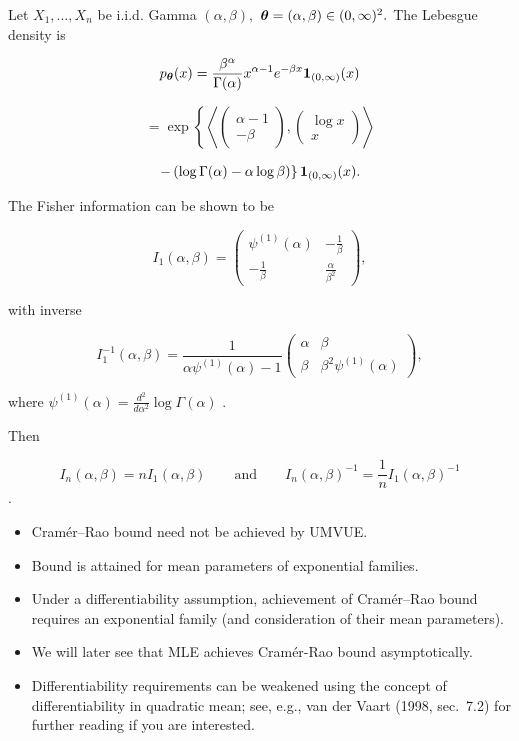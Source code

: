 \begin{ex}
    
Let \(X_1,\ldots,X_n\) be i.i.d. Gamma \((\alpha,\beta),\)
\(\boldsymbol{\theta}=(\alpha,\beta)\in(0,\infty)^2.\) The Lebesgue density is

\[p_{\boldsymbol{\theta}}(x) = \frac{\beta^{\alpha}}{\Gamma(\alpha)} x^{\alpha - 1} e^{-\beta x} \boldsymbol{1}_{(0,\infty)}(x)\]

\[= \exp\left\{ \left\langle \begin{pmatrix} \alpha - 1 \\ -\beta \end{pmatrix}, \begin{pmatrix} \log x \\ x \end{pmatrix} \right\rangle \right.\]

\[\left.- \left( \log \Gamma(\alpha) - \alpha \log \beta \right) \right\} \boldsymbol{1}_{(0,\infty)}(x).\]

The Fisher information can be shown to be

\[I_1(\alpha,\beta) = \begin{pmatrix} \psi^{(1)}(\alpha) & -\frac{1}{\beta} \\ -\frac{1}{\beta} & \frac{\alpha}{\beta^2} \end{pmatrix},\]

with inverse

\[I_1^{-1}(\alpha,\beta) = \frac{1}{\alpha\psi^{(1)}(\alpha) - 1} \begin{pmatrix} \alpha & \beta \\ \beta & \beta^2\psi^{(1)}(\alpha) \end{pmatrix},\]

where \(\psi^{(1)}(\alpha) = \frac{d^2}{d\alpha^2} \log \Gamma(\alpha)\)
.

Then

\[I_n(\alpha, \beta) = nI_1(\alpha, \beta) \quad \quad \text{and}\quad \quad 
I_n(\alpha, \beta)^{-1} = \frac{1}{n}I_1(\alpha, \beta)^{-1}\] .
\end{ex}

\begin{remark}[]
    \leavevmode
\begin{itemize}
	\item
	      Cram\'er--Rao bound need not be achieved by UMVUE.
	\item
	      Bound is attained for mean parameters of exponential families.
	\item
	      Under a differentiability assumption, achievement of Cram\'er--Rao bound
	      requires an exponential family (and consideration of their mean
	      parameters).
	\item
	      We will later see that MLE achieves Cram\'er-Rao bound asymptotically.
	\item
	      Differentiability requirements can be weakened using the concept of
	      differentiability in quadratic mean; see, e.g., van der Vaart (1998,
	      sec.~7.2) for further reading if you are interested.
\end{itemize}
\end{remark}

